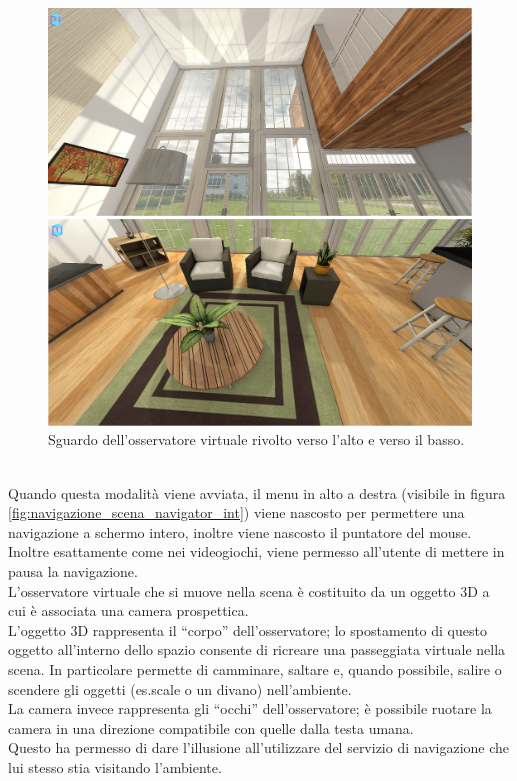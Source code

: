 \begin{figure}[h]
 \centering
 \includegraphics[width=0.80\linewidth]{images/chapter_navigazione_scena/vis_alta_bassa.png}\hfill
 \caption[Esempio 2 di osservazione virtuale]{Sguardo dell'osservatore virtuale rivolto verso l'alto e verso il basso.}
 \label{fig:navigazione_scena_vis_alta_bassa}
\end{figure}
\\
Quando questa modalità viene avviata, il menu in alto a destra (visibile in figura \ref{fig:navigazione_scena_navigator_int}) viene nascosto per permettere una navigazione a schermo intero, inoltre viene nascosto il puntatore del mouse.
\\
Inoltre esattamente come nei videogiochi, viene permesso all’utente di mettere in pausa la navigazione.
\\
L’osservatore virtuale che si muove nella scena è costituito da un oggetto 3D a cui è associata una camera prospettica.
\\
L’oggetto 3D rappresenta il “corpo” dell’osservatore; lo spostamento di questo oggetto all’interno dello spazio consente di ricreare una passeggiata virtuale nella scena.
In particolare permette di camminare, saltare e, quando possibile, salire o scendere gli oggetti (es.scale o un divano) nell’ambiente.
\\
La camera invece rappresenta gli “occhi” dell’osservatore; è possibile ruotare la camera in una direzione compatibile con quelle dalla testa umana. 
\\
Questo ha permesso di dare l’illusione all’utilizzare del servizio di navigazione che lui stesso stia visitando l’ambiente.
